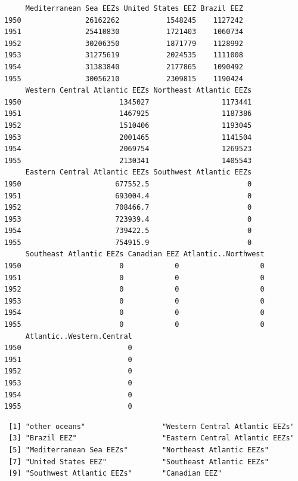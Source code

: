 \documentclass[
]{article}
\newenvironment{Shaded}{\begin{snugshade}}{\end{snugshade}}
\newcommand{\CommentTok}[1]{\textcolor[rgb]{0.37,0.37,0.37}{#1}}
\newcommand{\FunctionTok}[1]{\textcolor[rgb]{0.28,0.35,0.67}{#1}}
\newcommand{\NormalTok}[1]{\textcolor[rgb]{0.00,0.23,0.31}{#1}}
\newcommand{\SpecialCharTok}[1]{\textcolor[rgb]{0.37,0.37,0.37}{#1}}
\begin{document}
\begin{verbatim}
     Mediterranean Sea EEZs United States EEZ Brazil EEZ
1950               26162262           1548245    1127242
1951               25410830           1721403    1060734
1952               30206350           1871779    1128992
1953               31275619           2024535    1111008
1954               31383840           2177865    1090492
1955               30056210           2309815    1190424
     Western Central Atlantic EEZs Northeast Atlantic EEZs
1950                       1345027                 1173441
1951                       1467925                 1187386
1952                       1510406                 1193045
1953                       2001465                 1141504
1954                       2069754                 1269523
1955                       2130341                 1405543
     Eastern Central Atlantic EEZs Southwest Atlantic EEZs
1950                      677552.5                       0
1951                      693004.4                       0
1952                      708466.7                       0
1953                      723939.4                       0
1954                      739422.5                       0
1955                      754915.9                       0
     Southeast Atlantic EEZs Canadian EEZ Atlantic..Northwest
1950                       0            0                   0
1951                       0            0                   0
1952                       0            0                   0
1953                       0            0                   0
1954                       0            0                   0
1955                       0            0                   0
     Atlantic..Western.Central
1950                         0
1951                         0
1952                         0
1953                         0
1954                         0
1955                         0
\end{verbatim}

\begin{Shaded}
\end{Shaded}

\begin{verbatim}
 [1] "other oceans"                  "Western Central Atlantic EEZs"
 [3] "Brazil EEZ"                    "Eastern Central Atlantic EEZs"
 [5] "Mediterranean Sea EEZs"        "Northeast Atlantic EEZs"      
 [7] "United States EEZ"             "Southeast Atlantic EEZs"      
 [9] "Southwest Atlantic EEZs"       "Canadian EEZ"                 
\end{verbatim}
\end{document}
